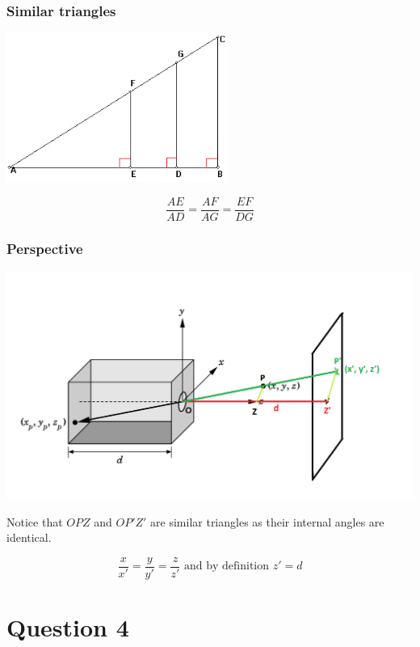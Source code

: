 \documentclass{beamer}
\begin{document}
\begin{frame}
    \frametitle{Similar triangles}

    \begin{center}
        \includegraphics[scale=0.8]{similar-tris.png}
    \end{center}

    $$
    \frac{AE}{AD} = \frac{AF}{AG} = \frac{EF}{DG}
    $$

\end{frame}

\begin{frame}
    \frametitle{Perspective}

    \begin{center}
        \includegraphics[scale=0.25]{q3-qn.png}
    \end{center}

    Notice that $OPZ$ and $OP'Z'$ are similar triangles as their internal angles are identical.

    $$
    \frac{x}{x'} = \frac{y}{y'} = \frac{z}{z'} \text{ and by definition } z' = d
    $$

\end{frame}

\section{Question 4}
\end{document}
